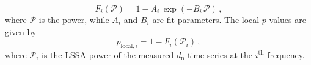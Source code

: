\begin{equation}
	\label{eq:powerdistribution}
	F_i(\mathcal{P}) = 1 - A_i\,\exp(-B_i\, \mathcal{P}) \, ,
\end{equation}
where $\mathcal{P}$ is the power, while $A_i$ and $B_i$
are fit parameters. The local $p$-values are given by
\begin{equation}
	\label{eq:localpvalue}
    p_{\mathrm{local}, i} = 1 - F_i(\mathcal{P}_i) \, ,
\end{equation}
where $\mathcal{P}_i$ is the LSSA power of the measured $d_\mathrm{n}$ time series at the $i^\textrm{th}$ frequency.

